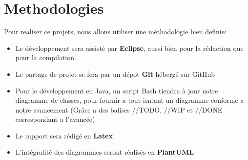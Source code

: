     \section{Methodologies}
        Pour realiser ce projets, nous allons utiliser une méthodologie bien definie:\\
        \begin{itemize}
            \item Le développement sera assisté par \textbf{Eclipse}, aussi bien pour la rédaction que pour la compilation.
            \item Le partage de projet se fera par un dépot \textbf{Git} hébergé sur GitHub
            \item Pour le développement en Java, un script Bash tiendra à jour notre diagramme de classes, pour fournir a tout isntant un diagramme conforme a notre avancement (Grâce a des balises //TODO, //WIP et //DONE correspondant a l'avancée)
            \item Le rapport sera rédigé en \textbf{Latex}
            \item L'intégralité des diagrammes seront réalisés en \textbf{PlantUML}
        \end{itemize}
